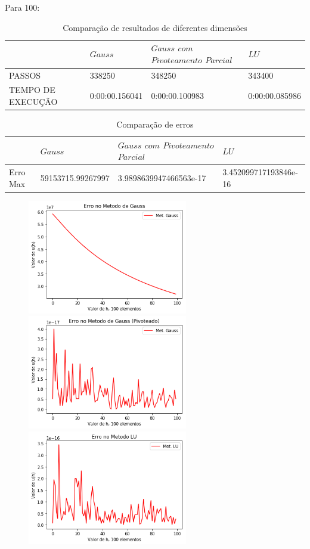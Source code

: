 \documentclass{article}
\begin{document}
Para 100:
\begin{table}[h]
\centering
  \begin{tabular}{l||l|l|l}
     & $ Gauss$ & $Gauss$ $com$ $Pivoteamento$ $Parcial$ & $LU$ \\
    \hline
    
    PASSOS & 338250 & 348250 & 343400 \\
    
    TEMPO DE EXECUÇÃO &  0:00:00.156041 & 0:00:00.100983 & 0:00:00.085986 \\
    
    \hline
  \end{tabular}
  \caption{Comparação de resultados de diferentes dimensões}
\end{table}

\begin{table}[h]
\centering
  \begin{tabular}{l||l|l|l}
     & $ Gauss$ & $Gauss$ $com$ $Pivoteamento$ $Parcial$ & $LU$ \\
    \hline
    
    Erro Max & 59153715.99267997 & 3.9898639947466563e-17 & 3.452099717193846e-16 \\
    
    
    \hline
  \end{tabular}
  \caption{Comparação de erros}
\end{table}

\begin{figure}[!htb]
\includegraphics[width=7cm,height=5cm]{EGauss100part.png}
\includegraphics [width=7cm,height=5cm]{EGaussP100part.png}
\includegraphics [width=7cm,height=5cm]{ELU100part.png}
\end{figure}
\end{document}
